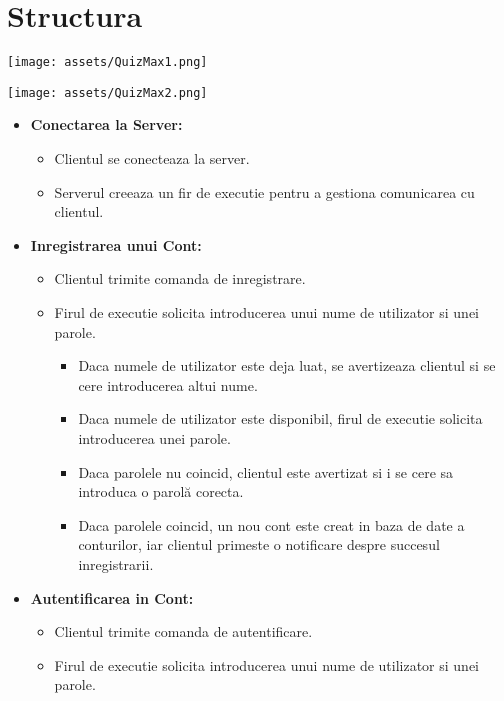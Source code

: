 \documentclass[runningheads]{llncs}
\begin{document}
\section{Structura}
\texttt{[image: assets/QuizMax1.png]}
\par
\texttt{[image: assets/QuizMax2.png]}

\begin{itemize}[label=$\bullet$]
    \item \textbf{Conectarea la Server:}
        \begin{itemize}
            \item Clientul se conecteaza la server.
            \item Serverul creeaza un fir de executie pentru a gestiona comunicarea cu clientul.
        \end{itemize}
    \item \textbf{Inregistrarea unui Cont:}
        \begin{itemize}[label=$\bullet$]
            \item Clientul trimite comanda de inregistrare.
            \item Firul de executie solicita introducerea unui nume de utilizator si unei parole.
                \begin{itemize}[label=$\bullet$]
                    \item Daca numele de utilizator este deja luat, se avertizeaza clientul si se cere introducerea altui nume.
                    \item Daca numele de utilizator este disponibil, firul de executie solicita introducerea unei parole.
                    \item Daca parolele nu coincid, clientul este avertizat si i se cere sa introduca o parolă corecta.
                    \item Daca parolele coincid, un nou cont este creat in baza de date a conturilor, iar clientul primeste o notificare despre succesul inregistrarii.
                \end{itemize}
        \end{itemize}
    \item \textbf{Autentificarea in Cont:}
        \begin{itemize}[label=$\bullet$]
            \item Clientul trimite comanda de autentificare.
            \item Firul de executie solicita introducerea unui nume de utilizator si unei parole.

\end{itemize}
\end{itemize}
\end{document}
